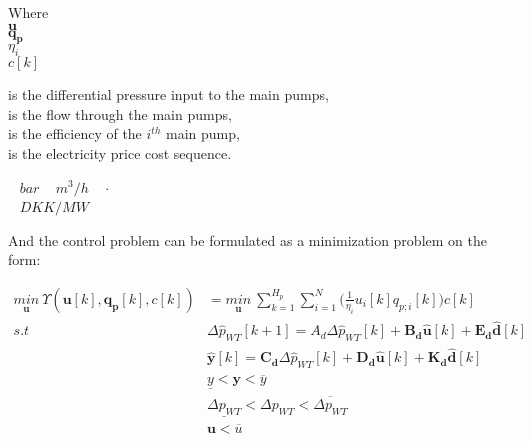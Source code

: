 \begin{minipage}[t]{0.20\textwidth}
Where\\
\hspace*{8mm} $\pmb{u}$ \\
\hspace*{8mm} $\pmb{q_p}$ \\
 \hspace*{8mm} $\eta_i$ \\
\hspace*{8mm} $c[k]$ 
\end{minipage}
\begin{minipage}[t]{0.68\textwidth}
\vspace*{2mm}
is the differential pressure input to the main pumps,\\
is the flow through the main pumps,\\
is the efficiency of the $i^{th}$ main pump,\\
is the electricity price cost sequence.
\end{minipage}
\begin{minipage}[t]{0.10\textwidth}
\vspace*{2mm}
\textcolor{White}{te}$\unit{bar}$
\textcolor{White}{te}$\unit{m^3/h}$
 \textcolor{White}{te}$\unit{\cdot}$\\
\textcolor{White}{te}$\unit{DKK/MW}$
\end{minipage}

And the control problem can be formulated as a minimization problem on the form:

\begin{align}
\underset{\pmb{u}}{min} \:  \Upsilon(\pmb{u}[k],\pmb{q_p}[k],c[k]) &= \underset{\pmb{u}}{min} \: \sum_{k=1}^{H_p} \sum_{i=1}^{N} \Big(\frac{1}{\eta_i} u_i[k]  q_{p;i}[k]\Big) c[k] \label{eqcost1} \\
%
s.t \:\:\:\:\: & \Delta \hat{p}_{WT} [k+1] = A_d \Delta \hat{p}_{WT}[k]  + \pmb{B_d} \pmb{\hat{u}}[k] + \pmb{E_d} \pmb{\hat{d}}[k]  \\
%
&\pmb{\hat{y}}[k] = \pmb{C_d} \Delta \hat{p}_{WT}[k] + \pmb{D_d} \pmb{\hat{u}}[k] + \pmb{K_d} \pmb{\hat{d}}[k] \\
%
& \underline{y} < \pmb{y} < \overline{y} \\
%
& \underline{\Delta p_{WT}} < \Delta p_{WT} < \overline{\Delta p_{WT}} \\
%
& \pmb{u} < \overline{u} \label{eqconst2} 
\end{align}

